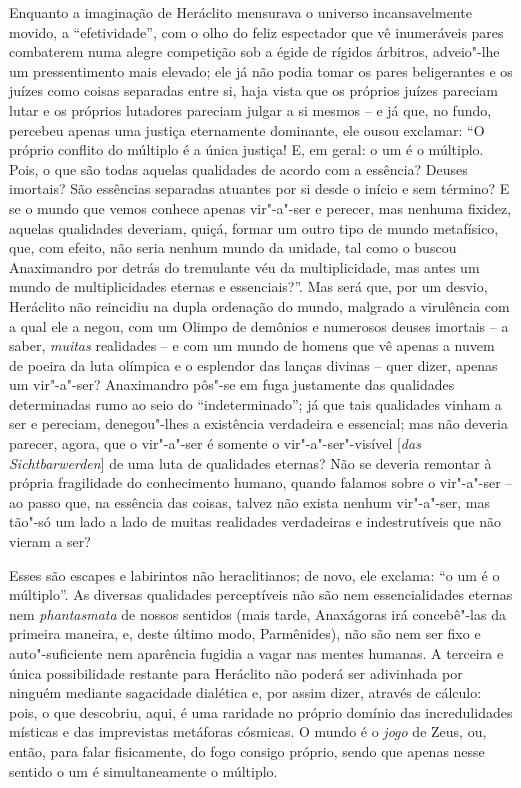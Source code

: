 Enquanto a imaginação de Heráclito mensurava o universo incansavelmente
movido, a ``efetividade'', com o olho do feliz espectador que vê
inumeráveis pares combaterem numa alegre competição sob a égide de
rígidos árbitros, adveio"-lhe um pressentimento mais elevado; ele já não
podia tomar os pares beligerantes e os juízes como coisas separadas
entre si, haja vista que os próprios juízes pareciam lutar e os
próprios lutadores pareciam julgar a si mesmos -- e já que, no fundo,
percebeu apenas uma justiça eternamente dominante, ele ousou exclamar: 
``O próprio conflito do múltiplo é a única justiça! E, em geral: o um é o
múltiplo. Pois, o que são todas aquelas qualidades de acordo com a
essência? Deuses imortais? São essências separadas atuantes por
si desde o início e sem término? E se o mundo que vemos conhece apenas
vir"-a"-ser e perecer, mas nenhuma fixidez, aquelas qualidades deveriam,
quiçá, formar um outro tipo de mundo metafísico, que, com efeito, não
seria nenhum mundo da unidade, tal como o buscou Anaximandro por detrás
do tremulante véu da multiplicidade, mas antes um mundo de
multiplicidades eternas e essenciais?''. Mas será que, por um desvio,
Heráclito não reincidiu na dupla ordenação do mundo, malgrado a
virulência com a qual ele a negou, com um Olimpo de demônios e
numerosos deuses imortais -- a saber, \textit{muitas} realidades -- e com
um mundo de homens que vê apenas a nuvem de poeira da luta olímpica e o
esplendor das lanças divinas -- quer dizer, apenas um vir"-a"-ser?
Anaximandro pôs"-se em fuga justamente das qualidades determinadas rumo
ao seio do ``indeterminado''; já que tais
qualidades vinham a ser e pereciam, denegou"-lhes a existência
verdadeira e essencial; mas não deveria parecer, agora, que o vir"-a"-ser
é somente o vir"-a"-ser"-visível [\textit{das} \textit{Sichtbarwerden}] de
uma luta de qualidades eternas? Não se deveria remontar à própria
fragilidade do conhecimento humano, quando falamos sobre o vir"-a"-ser -- 
ao passo que, na essência das coisas, talvez não exista nenhum
vir"-a"-ser, mas tão"-só um lado a lado de muitas realidades verdadeiras e
indestrutíveis que não vieram a ser?

Esses são escapes e labirintos não heraclitianos; de novo, ele exclama:
``o um é o múltiplo''. As diversas qualidades
perceptíveis não são nem essencialidades eternas nem \textit{phantasmata} de 
nossos sentidos (mais tarde, Anaxágoras irá concebê"-las da primeira
maneira, e, deste último modo, Parmênides), não são nem ser fixo e
auto"-suficiente nem aparência fugidia a vagar nas mentes humanas. A
terceira e única possibilidade restante para Heráclito não poderá ser
adivinhada por ninguém mediante sagacidade dialética e, por assim
dizer, através de cálculo: pois, o que descobriu, aqui, é uma raridade
no próprio domínio das incredulidades místicas e das imprevistas
metáforas cósmicas. O mundo é o \textit{jogo} de Zeus, ou, então,
para falar fisicamente, do fogo consigo próprio, sendo que apenas nesse
sentido o um é simultaneamente o múltiplo. 

